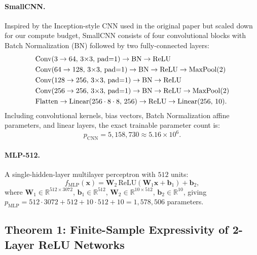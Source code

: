 \documentclass[12pt,a4paper]{article}
\theoremstyle{definition}
\theoremstyle{remark}
\begin{document}
\paragraph{SmallCNN.}
Inspired by the Inception-style CNN used in the original paper but scaled
down for our compute budget, SmallCNN consists of four convolutional blocks
with Batch Normalization (BN) followed by two fully-connected layers:
\begin{align}
  &\text{Conv}(3 \to 64,\, 3{\times}3,\, \mathrm{pad}{=}1) \to \mathrm{BN} \to \mathrm{ReLU} \notag\\
  &\text{Conv}(64 \to 128,\, 3{\times}3,\, \mathrm{pad}{=}1) \to \mathrm{BN} \to \mathrm{ReLU} \to \mathrm{MaxPool}(2) \notag\\
  &\text{Conv}(128 \to 256,\, 3{\times}3,\, \mathrm{pad}{=}1) \to \mathrm{BN} \to \mathrm{ReLU} \notag\\
  &\text{Conv}(256 \to 256,\, 3{\times}3,\, \mathrm{pad}{=}1) \to \mathrm{BN} \to \mathrm{ReLU} \to \mathrm{MaxPool}(2) \notag\\
  &\mathrm{Flatten} \to \mathrm{Linear}(256 \cdot 8 \cdot 8,\, 256) \to \mathrm{ReLU} \to \mathrm{Linear}(256,\, 10).
  \label{eq:cnn}
\end{align}
Including convolutional kernels, bias vectors, Batch Normalization affine
parameters, and linear layers, the exact trainable parameter count is:
\begin{equation}
  p_{\mathrm{CNN}} = 5{,}158{,}730 \approx 5.16 \times 10^6.
  \label{eq:cnn_params}
\end{equation}

\paragraph{MLP-512.}
A single-hidden-layer multilayer perceptron with $512$ units:
\begin{equation}
  f_{\mathrm{MLP}}(\mathbf{x}) =
    \mathbf{W}_2\, \mathrm{ReLU}(\mathbf{W}_1 \mathbf{x} + \mathbf{b}_1) + \mathbf{b}_2,
  \label{eq:mlp}
\end{equation}
where $\mathbf{W}_1 \in \mathbb{R}^{512 \times 3072}$,
$\mathbf{b}_1 \in \mathbb{R}^{512}$,
$\mathbf{W}_2 \in \mathbb{R}^{10 \times 512}$,
$\mathbf{b}_2 \in \mathbb{R}^{10}$, giving
$p_{\mathrm{MLP}} = 512{\cdot}3072 + 512 + 10{\cdot}512 + 10 = 1{,}578{,}506$
parameters.

\subsection{Theorem 1: Finite-Sample Expressivity of 2-Layer ReLU Networks}
\label{sec:theorem}
\end{document}
